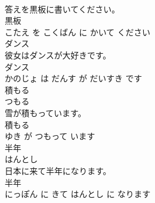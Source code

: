 \documentclass[8pt]{extreport}
\begin{document}
\begin{CJK}{UTF8}{min}
\\	答えを黒板に書いてください。	
\\	黒板 
\\	こたえ を こくばん に かいて ください			
\\	ダンス	
\\	彼女はダンスが大好きです。	
\\	ダンス 
\\	かのじょ は だんす が だいすき です			
\\	積もる	
\\	つもる			
\\	雪が積もっています。	
\\	積もる 
\\	ゆき が つもって います			
\\	半年	
\\	はんとし			
\\	日本に来て半年になります。	
\\	半年 
\\	にっぽん に きて はんとし に なります			
\end{CJK}
\end{document}
